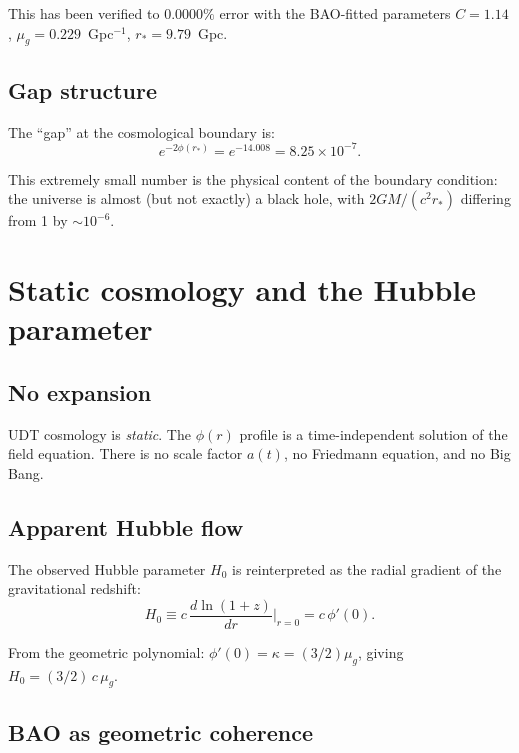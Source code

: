 \documentclass[11pt,letterpaper]{article}
\numberwithin{equation}{section}
\begin{document}
This has been verified to $0.0000\%$ error with the BAO-fitted parameters
$C = 1.14$, $\mu_g = 0.229$~Gpc$^{-1}$, $r_* = 9.79$~Gpc.

\subsection{Gap structure}

The ``gap'' at the cosmological boundary is:
\begin{equation}
  e^{-2\phi(r_*)} = e^{-14.008} = 8.25 \times 10^{-7}.
\end{equation}

This extremely small number is the physical content of the boundary
condition: the universe is almost (but not exactly) a black hole, with
$2GM/(c^2 r_*)$ differing from 1 by $\sim 10^{-6}$.

\section{Static cosmology and the Hubble parameter}
\label{sec:static}

\subsection{No expansion}

UDT cosmology is \emph{static}. The $\phi(r)$ profile is a time-independent
solution of the field equation. There is no scale factor $a(t)$, no Friedmann
equation, and no Big Bang.

\subsection{Apparent Hubble flow}

The observed Hubble parameter $H_0$ is reinterpreted as the radial gradient
of the gravitational redshift:
\begin{equation}
  H_0 \equiv c\,\frac{d\ln(1+z)}{dr}\bigg|_{r=0} = c\,\phi'(0).
\end{equation}

From the geometric polynomial: $\phi'(0) = \kappa = (3/2)\mu_g$, giving
$H_0 = (3/2)\,c\,\mu_g$.

\subsection{BAO as geometric coherence}
\end{document}
